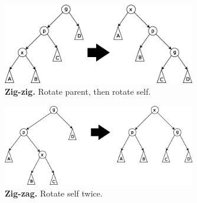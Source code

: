 \documentclass{article}
\begin{document}
\begin{figure}
  \center
  \includegraphics[width=0.75\textwidth]{Zigzig.png}
  \caption{\textbf{Zig-zig.} Rotate parent, then rotate self.}
\end{figure}

\begin{figure}
  \center
  \includegraphics[width=0.75\textwidth]{Zigzag.png}
  \caption{\textbf{Zig-zag.} Rotate self twice.}
\end{figure}
\end{document}

